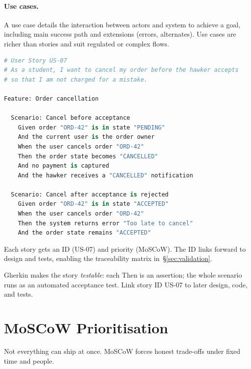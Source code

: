 \paragraph{Use cases.} A use case details the interaction between actors and system to achieve a goal, including main success path and extensions (errors, alternates). Use cases are richer than stories and suit regulated or complex flows.

\begin{lstlisting}[language=Python, caption={User story with Gherkin acceptance criteria --- executable specification}, label={lst:user-story}]
# User Story US-07
# As a student, I want to cancel my order before the hawker accepts
# so that I am not charged for a mistake.

Feature: Order cancellation

  Scenario: Cancel before acceptance
    Given order "ORD-42" is in state "PENDING"
    And the current user is the order owner
    When the user cancels order "ORD-42"
    Then the order state becomes "CANCELLED"
    And no payment is captured
    And the hawker receives a "CANCELLED" notification

  Scenario: Cancel after acceptance is rejected
    Given order "ORD-42" is in state "ACCEPTED"
    When the user cancels order "ORD-42"
    Then the system returns error "Too late to cancel"
    And the order state remains "ACCEPTED"
\end{lstlisting}

Each story gets an ID (US-07) and priority (MoSCoW). The ID links forward to design and tests, enabling the traceability matrix in~\S\ref{sec:validation}.

Gherkin makes the story \emph{testable}: each Then is an assertion; the whole scenario runs as an automated acceptance test. Link story ID US-07 to later design, code, and tests.

\section{MoSCoW Prioritisation}
\label{sec:moscow}
Not everything can ship at once. MoSCoW forces honest trade-offs under fixed time and people.

